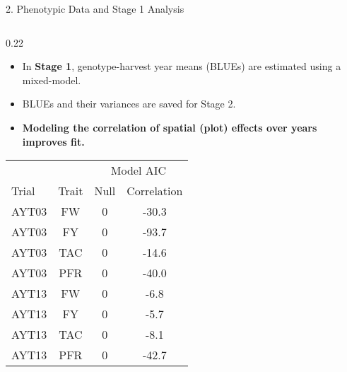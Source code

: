 \documentclass[final]{beamer}
\newlength{\twocolwid}
\begin{document}
\begin{frame}[t]
\begin{columns}[t]
\begin{column}{\twocolwid}
\begin{block}{2. Phenotypic Data and Stage 1 Analysis}
\begin{columns}[t,totalwidth=\twocolwid]
\begin{column}{0.22\twocolwid}
\vspace{-2cm}



\begin{footnotesize}

\begin{itemize}
  \item{In \textbf{Stage 1}, genotype-harvest year means (BLUEs) are estimated using a mixed-model\cite{Endelman2023-rk}.}
  \item{BLUEs and their variances are saved for Stage 2.}
  \item{\textbf{Modeling the correlation of spatial (plot) effects over years improves fit.}}
\end{itemize}


\end{footnotesize}


\begin{scriptsize}


\begin{table}
\centering
\begin{tabular}{lccc}
\toprule
\multicolumn{1}{c}{ } & \multicolumn{1}{c}{ } & \multicolumn{2}{c}{Model AIC} \\
\cmidrule(l{3pt}r{3pt}){3-4}
Trial & Trait & Null & Correlation\\
\midrule
AYT03 & FW & 0 & -30.3\\
AYT03 & FY & 0 & -93.7\\
AYT03 & TAC & 0 & -14.6\\
AYT03 & PFR & 0 & -40.0\\
AYT13 & FW & 0 & -6.8\\
AYT13 & FY & 0 & -5.7\\
AYT13 & TAC & 0 & -8.1\\
AYT13 & PFR & 0 & -42.7\\
\bottomrule
\end{tabular}
\end{table}


\end{scriptsize}



\end{column}


\end{columns}

\end{block}





\end{column}
\end{columns}
\end{frame}
\end{document}
